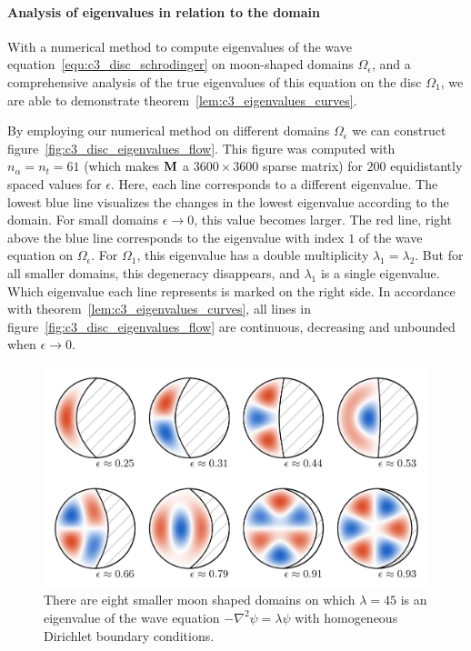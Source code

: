 \paragraph{Analysis of eigenvalues in relation to the domain}

With a numerical method to compute eigenvalues of the wave equation~\eqref{equ:c3_disc_schrodinger} on moon-shaped domains $\Omega_\epsilon$, and a comprehensive analysis of the true eigenvalues of this equation on the disc $\Omega_1$, we are able to demonstrate theorem~\ref{lem:c3_eigenvalues_curves}.

By employing our numerical method on different domains $\Omega_\epsilon$ we can construct figure~\ref{fig:c3_disc_eigenvalues_flow}. This figure was computed with $n_\alpha = n_t = 61$ (which makes $\vb{M}$ a $3600\times3600$ sparse matrix) for $200$ equidistantly spaced values for $\epsilon$. Here, each line corresponds to a different eigenvalue. The lowest blue line visualizes the changes in the lowest eigenvalue according to the domain. For small domains $\epsilon \to 0$, this value becomes larger. The red line, right above the blue line corresponds to the eigenvalue with index $1$ of the wave equation on $\Omega_\epsilon$. For $\Omega_1$, this eigenvalue has a double multiplicity $\lambda_1 = \lambda_2$. But for all smaller domains, this degeneracy disappears, and $\lambda_1$ is a single eigenvalue. Which eigenvalue each line represents is marked on the right side. In accordance with theorem~\ref{lem:c3_eigenvalues_curves}, all lines in figure~\ref{fig:c3_disc_eigenvalues_flow} are continuous, decreasing and unbounded when $\epsilon \to 0$.


\begin{figure}
  \begin{center}
    \includegraphics[width=\textwidth]{img/chapter3/on_disc/solutions.png}
    \caption{There are eight smaller moon shaped domains on which $\lambda = 45$ is an eigenvalue of the wave equation $-\nabla^2 \psi = \lambda \psi$ with homogeneous Dirichlet boundary conditions.}
    \label{fig:c3_disc_solutions}
  \end{center}
\end{figure}


